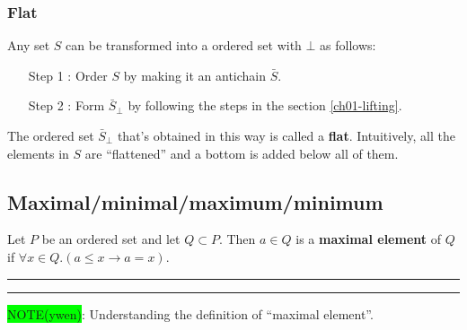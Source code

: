 \documentclass[12pt, letterpaper, oneside]{book}
\begin{document}
\subsubsection{Flat}

Any set $S$ can be transformed into a ordered set with $\bot$ as follows:
\begin{enumerate}
  \item[Step 1]: Order $S$ by making it an antichain $\bar{S}$.
  \item[Step 2]: Form $\bar{S}_{\bot}$ by following the steps in the section \ref{ch01-lifting}.
\end{enumerate}

The ordered set $\bar{S}_{\bot}$ that's obtained in this way is called a \textbf{flat}. Intuitively, all the elements
in $S$ are ``flattened'' and a bottom is added below all of them.


\subsection{Maximal/minimal/maximum/minimum}

Let $P$ be an ordered set and let $Q \subset P$. Then $a \in Q$ is a \textbf{maximal element} of $Q$ if $\forall x \in
  Q. (a \leqslant x \rightarrow a = x)$.

\noindent\rule[-9pt]{1cm}{10pt}\rule{10cm}{0.4pt}

\colorbox{lime}{NOTE(ywen)}: Understanding the definition of ``maximal element''.
\end{document}
